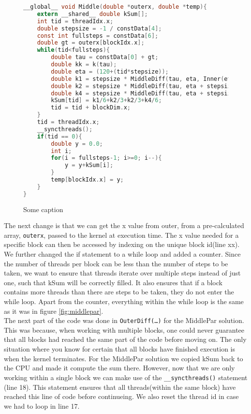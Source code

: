 \begin{figure}[ht]
\begin{lstlisting}[language=c]
__global__ void Middle(double *outerx, double *temp){
	extern __shared__ double kSum[];
	int tid = threadIdx.x;
	double stepsize = -1 / constData[4];
	const int fullsteps = constData[6];
	double gt = outerx[blockIdx.x];
	while(tid<fullsteps){
		double tau = constData[0] + gt;
		double kk = k(tau);
		double eta = (120+(tid*stepsize));
		double k1 = stepsize * MiddleDiff(tau, eta, Inner(eta, gt, kk).y);
		double k2 = stepsize * MiddleDiff(tau, eta + stepsize/2, Inner(eta + stepsize/2, gt, kk).y);		
		double k4 = stepsize * MiddleDiff(tau, eta + stepsize, Inner(eta + stepsize, gt, kk).y);
		kSum[tid] = k1/6+k2/3+k2/3+k4/6;
		tid = tid + blockDim.x;
	}
	tid = threadIdx.x;
	__syncthreads();
	if(tid == 0){
		double y = 0.0;
		int i;
		for(i = fullsteps-1; i>=0; i--){
			y = y+kSum[i];
		}
		temp[blockIdx.x] = y;
	}
}
\end{lstlisting}
\caption{Some caption}
\label{fig:outerpar}
\end{figure}

The next change is that we can get the x value from outer, from a pre-calculated array, \texttt{outerx}, passed to the kernel at execution time. The x value needed for a specific block can then be accessed by indexing on the unique block id(line xx).\\

We further changed the if statement to a while loop and added a counter. Since the number of threads per block can be less than the number of steps to be taken, we want to ensure that threads iterate over multiple steps instead of just one, such that kSum will be correctly filled. It also ensures that if a block contains more threads than there are steps to be taken, they do not enter the while loop. Apart from the counter, everything within the while loop is the same as it was in figure \ref{fig:middlepar}.\\

The next part of the code was done in \texttt{OuterDiff(…)} for the MiddlePar solution. This was because, when working with multiple blocks, one could never guarantee that all blocks had reached the same part of the code before moving on. The only situation where you know for certain that all blocks have finished execution is when the kernel terminates. For the MiddlePar solution we copied kSum back to the CPU and made it compute the sum there. However, now that we are only working within a single block we can make use of the \texttt{\_\_syncthreads()} statement (line 18). This statement ensures that all threads(within the same block) have reached this line of code before continueing. We also reset the thread id in case we had to loop in line 17. \\

